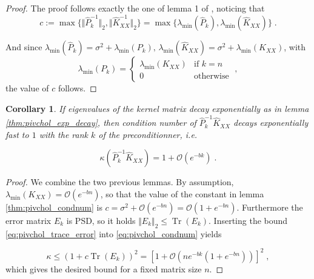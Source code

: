 \documentclass{article}
\newcommand{\norm}[1]{\Vert #1 \Vert}
\DeclareMathOperator{\trace}{Tr}
\newtheorem{corollary}{Corollary}[theorem]
\begin{document}
\begin{proof}
The proof follows exactly the one of lemma 1 of \cite{gardner_gpytorch_2021}, noticing that 
\begin{equation*}
    c := \max\{\norm{\widehat P_k^{-1}}_2, \norm{\widehat K_{XX}^{-1}}_2 \} 
    = \max\{\lambda_{\min}(\widehat P_k), \lambda_{\min}(\widehat K_{XX})\} \; .
\end{equation*}

And since $\lambda_{\min}(\widehat P_k) = \sigma^2 + \lambda_{\min}(P_k), \,
    \lambda_{\min}(\widehat K_{XX}) = \sigma^2 + \lambda_{\min}(K_{XX})$, with
\begin{equation*}
    \lambda_{\min}(P_k) = \begin{cases}
    \lambda_{\min}(K_{XX}) & \text{if } k = n\\
    0                      & \text{otherwise}
    \end{cases} \; ,
\end{equation*}
the value of $c$ follows.
\end{proof}
\makeatletter
\def\algbackskip{\hskip-\ALG@thistlm}
\makeatother
\begin{corollary}
If eigenvalues of the kernel matrix decay exponentially as in lemma \ref{thm:pivchol_exp_decay}, then condition number of $\widehat P_k^{-1} \widehat K_{XX}$ decays exponentially fast to $1$ with the rank $k$ of the preconditionner, i.e. 

\begin{equation*}
    \kappa \left( \widehat P_k^{-1} \widehat K_{XX} \right) = 1 + \mathcal O(e^{-b k}) \; .
\end{equation*}
\end{corollary}
\begin{proof}
We combine the two previous lemmas.
By assumption, $\lambda_{\min}(K_{XX}) = \mathcal O(e^{-bn})$, so that the value of the constant in lemma \ref{thm:pivchol_condnum} is $c = \sigma^2 + \mathcal O(e^{-bn}) = \mathcal O(1 + e^{-bn})$. Furthermore the error matrix $E_k$ is PSD, so it holds $\norm{E_k}_2 \le \trace(E_k)$. Inserting the bound \eqref{eq:pivchol_trace_error} into \eqref{eq:pivchol_condnum} yields

\begin{equation*}
    \kappa \le (1 + c \trace(E_k))^2 = \left[1 + \mathcal O \left( ne^{-bk} (1 + e^{-bn}) \right) \right]^2 \; ,
\end{equation*}
which gives the desired bound for a fixed matrix size $n$. 
\end{proof}
\end{document}
